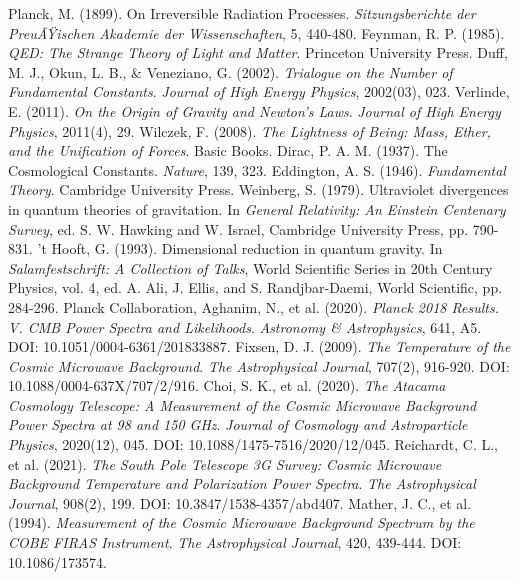 ﻿\documentclass[12pt,a4paper]{article}
\begin{document}
\begin{thebibliography}{99}
		 Planck, M. (1899). On Irreversible Radiation Processes. \textit{Sitzungsberichte der PreuÃŸischen Akademie der Wissenschaften}, 5, 440-480.
		 Feynman, R. P. (1985). \textit{QED: The Strange Theory of Light and Matter}. Princeton University Press.
		 Duff, M. J., Okun, L. B., \& Veneziano, G. (2002). \textit{Trialogue on the Number of Fundamental Constants}. \textit{Journal of High Energy Physics}, 2002(03), 023.
		 Verlinde, E. (2011). \textit{On the Origin of Gravity and Newton's Laws}. \textit{Journal of High Energy Physics}, 2011(4), 29.
		 Wilczek, F. (2008). \textit{The Lightness of Being: Mass, Ether, and the Unification of Forces}. Basic Books.
		 Dirac, P. A. M. (1937). The Cosmological Constants. \textit{Nature}, 139, 323.
		 Eddington, A. S. (1946). \textit{Fundamental Theory}. Cambridge University Press.
		 Weinberg, S. (1979). Ultraviolet divergences in quantum theories of gravitation. In \textit{General Relativity: An Einstein Centenary Survey}, ed. S. W. Hawking and W. Israel, Cambridge University Press, pp. 790-831.
		 't Hooft, G. (1993). Dimensional reduction in quantum gravity. In \textit{Salamfestschrift: A Collection of Talks}, World Scientific Series in 20th Century Physics, vol. 4, ed. A. Ali, J. Ellis, and S. Randjbar-Daemi, World Scientific, pp. 284-296.
		 Planck Collaboration, Aghanim, N., et al. (2020). \textit{Planck 2018 Results. V. CMB Power Spectra and Likelihoods}. \textit{Astronomy \& Astrophysics}, 641, A5. DOI: 10.1051/0004-6361/201833887.
		 Fixsen, D. J. (2009). \textit{The Temperature of the Cosmic Microwave Background}. \textit{The Astrophysical Journal}, 707(2), 916-920. DOI: 10.1088/0004-637X/707/2/916.
		 Choi, S. K., et al. (2020). \textit{The Atacama Cosmology Telescope: A Measurement of the Cosmic Microwave Background Power Spectra at 98 and 150 GHz}. \textit{Journal of Cosmology and Astroparticle Physics}, 2020(12), 045. DOI: 10.1088/1475-7516/2020/12/045.
		 Reichardt, C. L., et al. (2021). \textit{The South Pole Telescope 3G Survey: Cosmic Microwave Background Temperature and Polarization Power Spectra}. \textit{The Astrophysical Journal}, 908(2), 199. DOI: 10.3847/1538-4357/abd407.
		 Mather, J. C., et al. (1994). \textit{Measurement of the Cosmic Microwave Background Spectrum by the COBE FIRAS Instrument}. \textit{The Astrophysical Journal}, 420, 439-444. DOI: 10.1086/173574.

\end{thebibliography}
\end{document}
